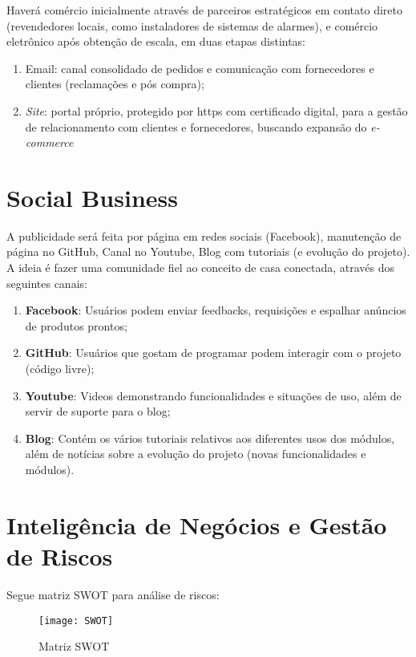 Haverá comércio inicialmente através de parceiros estratégicos em contato direto (revendedores locais, como instaladores de sistemas de alarmes), e comércio eletrônico após obtenção de escala, em duas etapas distintas:
\begin{enumerate}
	\item Email: canal consolidado de pedidos e comunicação com fornecedores e clientes (reclamações e pós compra);
	\item \textit{Site}: portal próprio, protegido por https com certificado digital, para a gestão de relacionamento com clientes e fornecedores, buscando expansão do \textit{e-commerce} 
\end{enumerate}

\section{Social Business}

A publicidade será feita por página em redes sociais (Facebook), manutenção de página no GitHub, Canal no Youtube, Blog com tutoriais (e evolução do projeto). A ideia é fazer uma comunidade fiel ao conceito de casa conectada, através dos seguintes canais:
\begin{enumerate}
	\item \textbf{Facebook}: Usuários podem enviar feedbacks, requisições e espalhar anúncios de produtos prontos;
	\item \textbf{GitHub}: Usuários que gostam de programar podem interagir com o projeto (código livre);
	\item \textbf{Youtube}: Videos demonstrando funcionalidades e situações de uso, além de servir de suporte para o blog;
	\item \textbf{Blog}: Contém os vários tutoriais relativos aos diferentes usos dos módulos, além de notícias sobre a evolução do projeto (novas funcionalidades e módulos).
\end{enumerate}

\section{Inteligência de Negócios e Gestão de Riscos}


Segue matriz SWOT para análise de riscos:

\begin{figure}[htb]
	\caption{\label{fig:SWOT}Matriz SWOT}
	\begin{center}
		\texttt{[image: SWOT]}
	\end{center}
\end{figure}